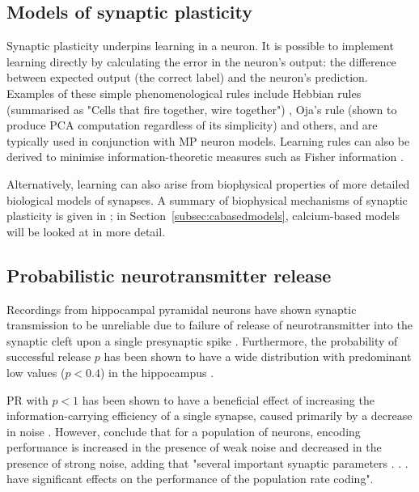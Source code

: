 \documentclass[a4paper,12pt]{report}
\theoremstyle{definition}
\begin{document}
\subsection{Models of synaptic plasticity}
\label{subsec:modelsofplasticity}

Synaptic plasticity underpins learning in a neuron. It is possible to implement learning directly by calculating the error in the neuron's output: the difference between expected output (the correct label) and the neuron's prediction. Examples of these simple phenomenological rules include Hebbian rules (summarised as "Cells that fire together, wire together") \cite{hebb1952organisation}, Oja's rule (shown to produce PCA computation regardless of its simplicity) \cite{oja2008oja} and others, and are typically used in conjunction with MP neuron models. Learning rules can also be derived to minimise information-theoretic measures such as Fisher information \cite{echeveste2014generating}.

Alternatively, learning can also arise from biophysical properties of more detailed biological models of synapses. A summary of biophysical mechanisms of synaptic plasticity is given in \cite{shouval2007models}; in Section~\ref{subsec:cabasedmodels}, calcium-based models will be looked at in more detail.


\subsection{Probabilistic neurotransmitter release}

Recordings from hippocampal pyramidal neurons have shown synaptic transmission to be unreliable due to failure of release of neurotransmitter into the synaptic cleft upon a single presynaptic spike \cite{stevens1995facilitation}. Furthermore, the probability of successful release $p$ has been shown to have a wide distribution with predominant low values ($p < 0.4$) in the hippocampus \cite{murthy1997heterogeneous}.

PR with $p<1$ has been shown to have a beneficial effect of increasing the information-carrying efficiency of a single synapse, caused primarily by a decrease in noise \cite{goldman2004enhancement}. However, \cite{guo2012population} conclude that for a population of neurons, encoding performance is increased in the presence of weak noise and decreased in the presence of strong noise, adding that "several important synaptic parameters . . . have significant effects on the performance of the population rate coding".
\end{document}
